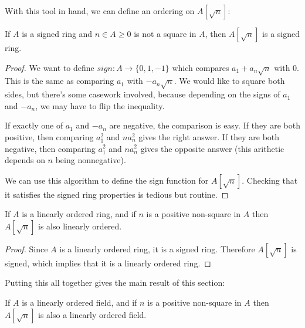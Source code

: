 
With this tool in hand, we can define an ordering on $A[\sqrt{n}]$:

\begin{definition}
  \label{def:adjoinSign}
  If $A$ is a signed ring and $n ∈ A \geq 0$ is not a square in $A$, then
  $A[\sqrt{n}]$ is a signed ring.
\end{definition}

\begin{proof}
  We want to define $sign : A → \{0,1,-1\}$ which compares $a_1 + a_n\sqrt{n}$
  with 0. This is the same as comparing $a_1$ with $-a_n\sqrt{n}$. We would
  like to square both sides, but there's some casework involved, because
  depending on the signs of $a_1$ and $-a_n$, we may have to flip the
  inequality.

  If exactly one of $a_1$ and $-a_n$ are negative, the comparison is easy. If they
  are both positive, then comparing $a_1^2$ and $na_n^2$ gives the right
  answer. If they are both negative, then comparing $a_1^2$ and $na_n^2$ gives
  the opposite answer (this arithetic depends on $n$ being nonnegative).

  We can use this algorithm to define the sign function for $A[\sqrt{n}]$.
  Checking that it satisfies the signed ring properties is tedious but routine.
\end{proof}

\begin{corollary}
  \label{thm:adjoinOrderedRing}
  If $A$ is a linearly ordered ring, and if $n$ is a positive non-square in $A$
  then $A[\sqrt{n}]$ is also linearly ordered.
\end{corollary}

\begin{proof}
  \leanok
  Since $A$ is a linearly ordered ring, it is a signed ring. Therefore $A[\sqrt{n}]$ is signed,
  which implies that it is a linearly ordered ring.
\end{proof}


Putting this all together gives the main result of this section:

\begin{theorem}
  \label{thm:adjoinOrderedField}

  If $A$ is a linearly ordered field, and if $n$ is a positive non-square in $A$
  then $A[\sqrt{n}]$ is also a linearly ordered field.
\end{theorem}


